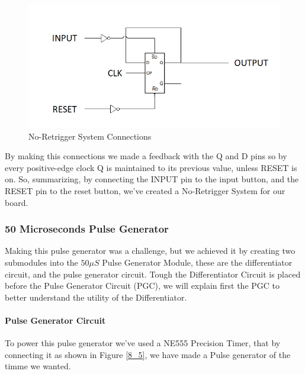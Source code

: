 \begin{figure}[h!]
\begin{centering}
\includegraphics[scale=0.5]{../Exercise8/Informe/images/NO-RETRIGGER_SYSTEM}
\par\end{centering}
\caption{\color{cyan}No-Retrigger System Connections}

\end{figure}

By making this connections we made a feedback with the Q and D pins
so by every positive-edge clock Q is maintained to its previous value,
unless RESET is on. So, summarizing, by connecting the INPUT pin to
the input button, and the RESET pin to the reset button, we've created
a No-Retrigger System for our board.

\subsubsection{\color{red}50 Microseconds Pulse Generator}

Making this pulse generator was a challenge, but we achieved it by
creating two submodules into the $50\mu S$ Pulse Generator Module,
these are the differentiator circuit, and the pulse generator circuit.
Tough the Differentiator Circuit is placed before the Pulse Generator
Circuit (PGC), we will explain first the PGC to better understand
the utility of the Differentiator.

\paragraph{Pulse Generator Circuit}

To power this pulse generator we've used a NE555 Precision Timer,
that by connecting it as shown in Figure \ref{8_5}, we have made
a Pulse generator of the timme we wanted.


